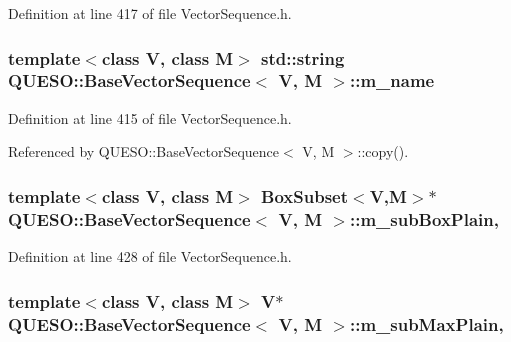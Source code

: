 Definition at line 417 of file Vector\-Sequence.\-h.

\hypertarget{class_q_u_e_s_o_1_1_base_vector_sequence_a3c379b2f7c20a2a1dd083ea43fca1494}{
\subsubsection[{m\-\_\-name}]{\setlength{\rightskip}{0pt plus 5cm}template$<$class V, class M$>$ std\-::string {\bf Q\-U\-E\-S\-O\-::\-Base\-Vector\-Sequence}$<$ V, M $>$\-::m\-\_\-name\hspace{0.3cm}{\ttfamily [protected]}}}\label{class_q_u_e_s_o_1_1_base_vector_sequence_a3c379b2f7c20a2a1dd083ea43fca1494}


Definition at line 415 of file Vector\-Sequence.\-h.



Referenced by Q\-U\-E\-S\-O\-::\-Base\-Vector\-Sequence$<$ V, M $>$\-::copy().

\hypertarget{class_q_u_e_s_o_1_1_base_vector_sequence_a8fa117289936a6b0cd83dd55aaf55047}{
\subsubsection[{m\-\_\-sub\-Box\-Plain}]{\setlength{\rightskip}{0pt plus 5cm}template$<$class V, class M$>$ {\bf Box\-Subset}$<$V,M$>$$\ast$ {\bf Q\-U\-E\-S\-O\-::\-Base\-Vector\-Sequence}$<$ V, M $>$\-::m\-\_\-sub\-Box\-Plain\hspace{0.3cm}{\ttfamily [mutable]}, {\ttfamily [protected]}}}\label{class_q_u_e_s_o_1_1_base_vector_sequence_a8fa117289936a6b0cd83dd55aaf55047}


Definition at line 428 of file Vector\-Sequence.\-h.

\hypertarget{class_q_u_e_s_o_1_1_base_vector_sequence_a1f24826fd2ca206a6e2662ade55dc5cb}{
\subsubsection[{m\-\_\-sub\-Max\-Plain}]{\setlength{\rightskip}{0pt plus 5cm}template$<$class V, class M$>$ V$\ast$ {\bf Q\-U\-E\-S\-O\-::\-Base\-Vector\-Sequence}$<$ V, M $>$\-::m\-\_\-sub\-Max\-Plain\hspace{0.3cm}{\ttfamily [mutable]}, {\ttfamily [protected]}}}\label{class_q_u_e_s_o_1_1_base_vector_sequence_a1f24826fd2ca206a6e2662ade55dc5cb}


